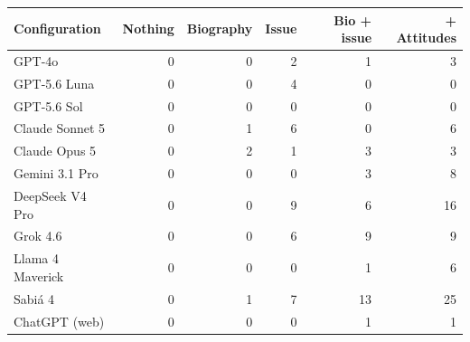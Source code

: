 \begin{tabular}{lrrrrr}
\toprule
Configuration & Nothing & Biography & Issue & Bio + issue & + Attitudes \\
\midrule
GPT-4o & 0 & 0 & 2 & 1 & 3 \\
GPT-5.6 Luna & 0 & 0 & 4 & 0 & 0 \\
GPT-5.6 Sol & 0 & 0 & 0 & 0 & 0 \\
Claude Sonnet 5 & 0 & 1 & 6 & 0 & 6 \\
Claude Opus 5 & 0 & 2 & 1 & 3 & 3 \\
Gemini 3.1 Pro & 0 & 0 & 0 & 3 & 8 \\
DeepSeek V4 Pro & 0 & 0 & 9 & 6 & 16 \\
Grok 4.6 & 0 & 0 & 6 & 9 & 9 \\
Llama 4 Maverick & 0 & 0 & 0 & 1 & 6 \\
Sabi\'a 4 & 0 & 1 & 7 & 13 & 25 \\
ChatGPT (web) & 0 & 0 & 0 & 1 & 1 \\
\bottomrule
\end{tabular}
